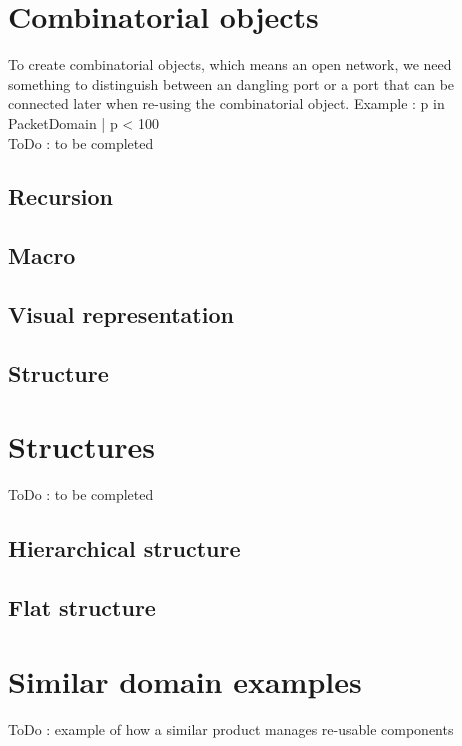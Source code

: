 \documentclass[a4paper,11pt,final]{article}
\begin{document}
\newpage
\section{Combinatorial objects}
To create combinatorial objects, which means an open network, we need something to distinguish between an dangling port or a port that can be connected later when re-using the combinatorial object. Example : {p in PacketDomain | p < 100}
\\ToDo : to be completed
\subsection{Recursion}
\subsection{Macro}
\subsection{Visual representation}
\subsection{Structure}

\newpage
\section{Structures}
ToDo : to be completed
\subsection{Hierarchical structure}
\subsection{Flat structure}

\newpage
\section{Similar domain examples}
ToDo : example of how a similar product manages re-usable components 
\end{document}
